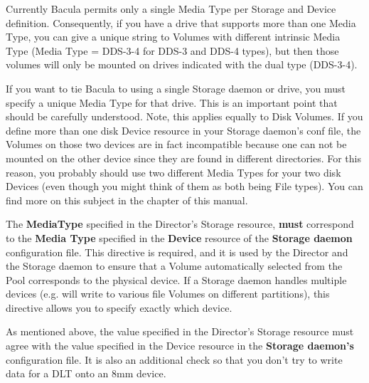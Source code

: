 \begin{description}
   Currently Bacula permits only a single Media Type per Storage           
   and Device definition. Consequently, if
   you have a drive that supports more than one Media Type, you can
   give a unique string to Volumes with different intrinsic Media 
   Type (Media Type = DDS-3-4 for DDS-3 and DDS-4 types), but then
   those volumes will only be mounted on drives indicated with the
   dual type (DDS-3-4).

   If you want to tie Bacula to using a single Storage daemon or drive, you
   must specify a unique Media Type for that drive.  This is an important
   point that should be carefully understood.  Note, this applies equally
   to Disk Volumes.  If you define more than one disk Device resource in
   your Storage daemon's conf file, the Volumes on those two devices are in
   fact incompatible because one can not be mounted on the other device
   since they are found in different directories.  For this reason, you
   probably should use two different Media Types for your two disk Devices
   (even though you might think of them as both being File types).  You can
   find more on this subject in the  chapter of this manual.

   The {\bf MediaType} specified in the Director's Storage resource, {\bf
   must} correspond to the {\bf Media Type} specified in the {\bf Device}
   resource of the {\bf Storage daemon} configuration file.  This directive
   is required, and it is used by the Director and the Storage daemon to
   ensure that a Volume automatically selected from the Pool corresponds to
   the physical device.  If a Storage daemon handles multiple devices (e.g.
   will write to various file Volumes on different partitions), this
   directive allows you to specify exactly which device.

   As mentioned above, the value specified in the Director's Storage
   resource must agree with the value specified in the Device resource in
   the {\bf Storage daemon's} configuration file.  It is also an additional
   check so that you don't try to write data for a DLT onto an 8mm device.


\end{description}
